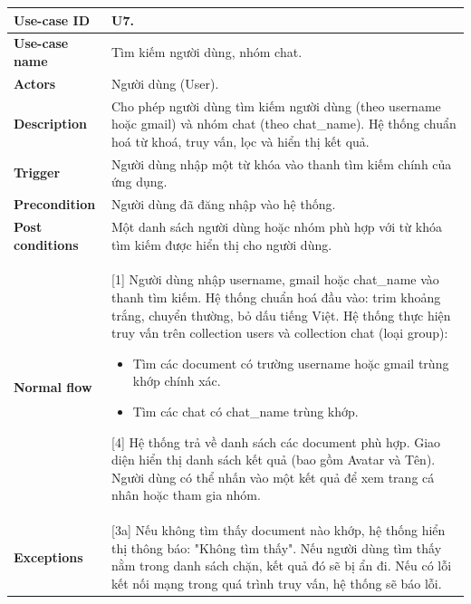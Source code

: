 \documentclass[a4paper, 12pt]{article}
\begin{document}
	\begin{longtable}{|p{3.5cm}|p{12cm}|}
		\hline
		\textbf{Use-case ID} & U7. \\
		\hline
		\textbf{Use-case name} & Tìm kiếm người dùng, nhóm chat. \\
		\hline
		\textbf{Actors} & Người dùng (User). \\
		\hline
		\textbf{Description} & Cho phép người dùng tìm kiếm người dùng (theo username hoặc gmail) và nhóm chat (theo chat\_name). Hệ thống chuẩn hoá từ khoá, truy vấn, lọc và hiển thị kết quả. \\
		\hline
		\textbf{Trigger} & Người dùng nhập một từ khóa vào thanh tìm kiếm chính của ứng dụng. \\
		\hline
		\textbf{Precondition} & Người dùng đã đăng nhập vào hệ thống. \\
		\hline
		\textbf{Post conditions} & Một danh sách người dùng hoặc nhóm phù hợp với từ khóa tìm kiếm được hiển thị cho người dùng. \\
		\hline
		\textbf{Normal flow} & 
		[1] Người dùng nhập username, gmail hoặc chat\_name vào thanh tìm kiếm. \newline
		[2] Hệ thống chuẩn hoá đầu vào: trim khoảng trắng, chuyển thường, bỏ dấu tiếng Việt. \newline
		[3] Hệ thống thực hiện truy vấn trên collection users và collection chat (loại group):
		\begin{itemize}[nosep, leftmargin=0.5cm, label={-}]
			\item Tìm các document có trường username hoặc gmail trùng khớp chính xác.
			\item Tìm các chat có chat\_name trùng khớp.
		\end{itemize}
		[4] Hệ thống trả về danh sách các document phù hợp. \newline
		[5] Giao diện hiển thị danh sách kết quả (bao gồm Avatar và Tên). \newline
		[6] Người dùng có thể nhấn vào một kết quả để xem trang cá nhân hoặc tham gia nhóm. \\
		\hline
		\textbf{Exceptions} & 
		[3a] Nếu không tìm thấy document nào khớp, hệ thống hiển thị thông báo: "Không tìm thấy". \newline
		[3b] Nếu người dùng tìm thấy nằm trong danh sách chặn, kết quả đó sẽ bị ẩn đi. \newline
		[3c] Nếu có lỗi kết nối mạng trong quá trình truy vấn, hệ thống sẽ báo lỗi. \\
		\hline
	\end{longtable}
	\vspace{0.5cm}
	
\end{document}
